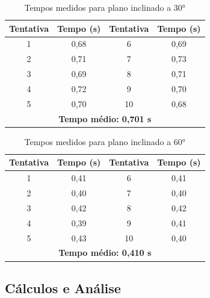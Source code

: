 \documentclass[a4paper, 12pt]{article}
\begin{document}
\begin{table}[!htpb]
	\centering
	\caption{Tempos medidos para plano inclinado a 30°}
	\small
	\begin{tabular}{|c|c||c|c|}
		\hline
		\textbf{Tentativa} & \textbf{Tempo (s)} & \textbf{Tentativa} & \textbf{Tempo (s)} \\ \hline
		1                  & 0,68               & 6                  & 0,69               \\ \hline
		2                  & 0,71               & 7                  & 0,73               \\ \hline
		3                  & 0,69               & 8                  & 0,71               \\ \hline
		4                  & 0,72               & 9                  & 0,70               \\ \hline
		5                  & 0,70               & 10                 & 0,68               \\ \hline
		\multicolumn{4}{|c|}{\textbf{Tempo médio: 0,701 s}}                               \\ \hline
	\end{tabular}
\end{table}

\begin{table}[!htpb]
	\centering
	\caption{Tempos medidos para plano inclinado a 60°}
	\small
	\begin{tabular}{|c|c||c|c|}
		\hline
		\textbf{Tentativa} & \textbf{Tempo (s)} & \textbf{Tentativa} & \textbf{Tempo (s)} \\ \hline
		1                  & 0,41               & 6                  & 0,41               \\ \hline
		2                  & 0,40               & 7                  & 0,40               \\ \hline
		3                  & 0,42               & 8                  & 0,42               \\ \hline
		4                  & 0,39               & 9                  & 0,41               \\ \hline
		5                  & 0,43               & 10                 & 0,40               \\ \hline
		\multicolumn{4}{|c|}{\textbf{Tempo médio: 0,410 s}}                               \\ \hline
	\end{tabular}
\end{table}

\subsection{Cálculos e Análise}
\end{document}
